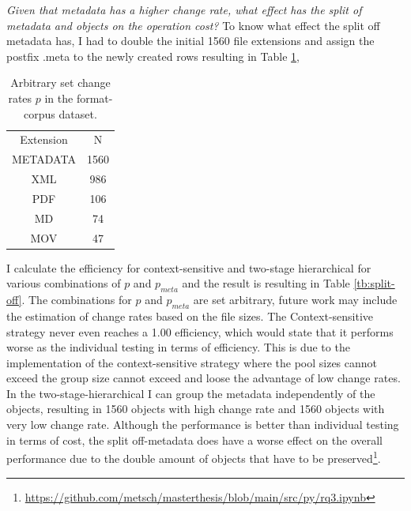 \textit{Given that metadata has a higher change rate, what effect has the split of metadata and objects on the operation cost?}
To know what effect the split off metadata has, I had to double the initial 1560 file extensions and assign the postfix .meta to the newly created rows resulting in Table \ref{tb:metadata},
\begin{table}[t]
    \centering
    \begin{tabular}{c c}
        Extension & N \\
        METADATA & 1560 \\
        XML& 986 \\
        PDF& 106  \\
        MD& 74  \\
        MOV& 47  
    \end{tabular}
    \caption{Arbitrary set change rates $p$ in the format-corpus dataset.}
    \label{tb:metadata}
\end{table}
I calculate the efficiency for context-sensitive and two-stage hierarchical for various combinations of $p$ and $p_{meta}$ and the result is resulting in Table \ref{tb:split-off}. The combinations for $p$ and $p_{meta}$ are set arbitrary, future work may include the estimation of change rates based on the file sizes.
The Context-sensitive strategy never even reaches a 1.00 efficiency, which would state that it performs worse as the individual testing in terms of efficiency. This is due to the implementation of the context-sensitive strategy where the pool sizes cannot exceed the group size cannot exceed and loose the advantage of low change rates. In the two-stage-hierarchical I can group the metadata independently of the objects, resulting in 1560 objects with high change rate and 1560 objects with very low change rate. Although the performance is better than individual testing in terms of cost, the split off-metadata does have a worse effect on the overall performance due to the double amount of objects that have to be preserved\footnote{\url{https://github.com/metsch/masterthesis/blob/main/src/py/rq3.ipynb}}.
